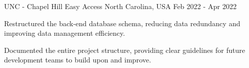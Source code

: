 \begin{cventries}

  \cventry
    {UNC - Chapel Hill} %
    {Easy Access} %
    {North Carolina, USA} %
    {Feb 2022 - Apr 2022} %
    {
      \begin{cvitems} %
        \item {Restructured the back-end database schema, reducing data redundancy and improving data management efficiency.}
        \item {Documented the entire project structure, providing clear guidelines for future development teams to build upon and improve.}
      \end{cvitems}
    }

\end{cventries}
